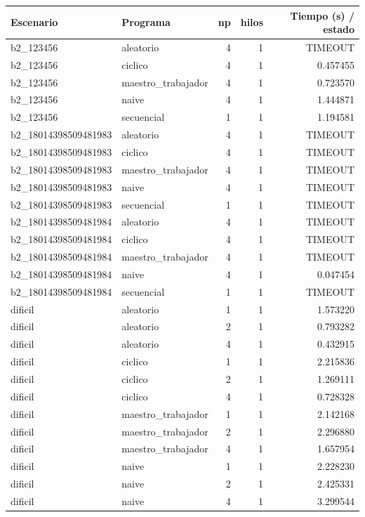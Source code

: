 \begin{longtable}{llrrr}
\toprule
Escenario & Programa & np & hilos & Tiempo (s) / estado \\
\midrule
\endhead
b2\_123456 & aleatorio & 4 & 1 & TIMEOUT \\
b2\_123456 & ciclico & 4 & 1 & 0.457455 \\
b2\_123456 & maestro\_trabajador & 4 & 1 & 0.723570 \\
b2\_123456 & naive & 4 & 1 & 1.444871 \\
b2\_123456 & secuencial & 1 & 1 & 1.194581 \\
b2\_18014398509481983 & aleatorio & 4 & 1 & TIMEOUT \\
b2\_18014398509481983 & ciclico & 4 & 1 & TIMEOUT \\
b2\_18014398509481983 & maestro\_trabajador & 4 & 1 & TIMEOUT \\
b2\_18014398509481983 & naive & 4 & 1 & TIMEOUT \\
b2\_18014398509481983 & secuencial & 1 & 1 & TIMEOUT \\
b2\_18014398509481984 & aleatorio & 4 & 1 & TIMEOUT \\
b2\_18014398509481984 & ciclico & 4 & 1 & TIMEOUT \\
b2\_18014398509481984 & maestro\_trabajador & 4 & 1 & TIMEOUT \\
b2\_18014398509481984 & naive & 4 & 1 & 0.047454 \\
b2\_18014398509481984 & secuencial & 1 & 1 & TIMEOUT \\
dificil & aleatorio & 1 & 1 & 1.573220 \\
dificil & aleatorio & 2 & 1 & 0.793282 \\
dificil & aleatorio & 4 & 1 & 0.432915 \\
dificil & ciclico & 1 & 1 & 2.215836 \\
dificil & ciclico & 2 & 1 & 1.269111 \\
dificil & ciclico & 4 & 1 & 0.728328 \\
dificil & maestro\_trabajador & 1 & 1 & 2.142168 \\
dificil & maestro\_trabajador & 2 & 1 & 2.296880 \\
dificil & maestro\_trabajador & 4 & 1 & 1.657954 \\
dificil & naive & 1 & 1 & 2.228230 \\
dificil & naive & 2 & 1 & 2.425331 \\
dificil & naive & 4 & 1 & 3.299544 \\

\end{longtable}
